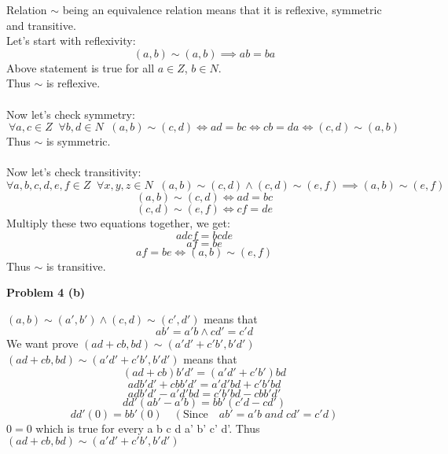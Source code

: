 \documentclass{article}
\begin{document}
Relation $\sim$ being an equivalence relation means that it is reflexive, symmetric and transitive. \\
Let's start with reflexivity: \\
\[
   (a, b) \sim (a, b) \implies ab = ba
\]
Above statement is true for all $a \in Z$, $b \in N$. \\
Thus $\sim$ is reflexive. \\
\\
Now let's check symmetry: \\
\[
   \forall a,c \in Z \;\; \forall b,d \in N \;\; (a, b) \sim (c, d) \iff ad = bc \iff cb = da \iff (c, d) \sim (a, b)
\]
Thus $\sim$ is symmetric. \\
\\
Now let's check transitivity: \\
\[
   \forall a,b,c,d,e,f \in Z \;\; \forall x,y,z \in N \;\; (a, b) \sim (c, d) \land (c, d) \sim (e, f) \implies (a, b) \sim (e, f)
\]
\[
   (a, b) \sim (c, d) \iff ad = bc
\]
\[
   (c, d) \sim (e, f) \iff cf = de
\]
Multiply these two equations together, we get:
\[
   adcf = bcde
\]
\[
   af = be
\]
\[
   af = be \iff (a, b) \sim (e, f)
\]
Thus $\sim$ is transitive.


\begin{flushleft}
   \textbf{\large Problem 4 (b)}
\end{flushleft}

\((a, b) \sim (a', b') \land (c, d) \sim (c', d')\) means that
\[
   ab' = a'b \land cd' = c'd
\]
We want prove \((ad+cb,bd) \sim (a'd'+c'b',b'd')\) \\
\((ad+cb,bd) \sim (a'd'+c'b',b'd')\) means that
\[
   (ad+cb)b'd' = (a'd'+c'b')bd
\]
\[
   adb'd' + cbb'd' = a'd'bd + c'b'bd
\]
\[
   adb'd' - a'd'bd = c'b'bd - cbb'd'
\]
\[
   dd'(ab' - a'b) = bb'(c'd - cd')
\]
\[
   dd'(0) = bb'(0) \quad (\text{Since} \quad ab' = a'b \; and \; cd' = c'd)
\]
\(0 = 0\) which is true for every a b c d a' b' c' d'. Thus \((ad+cb,bd) \sim (a'd'+c'b',b'd')\)
\end{document}

